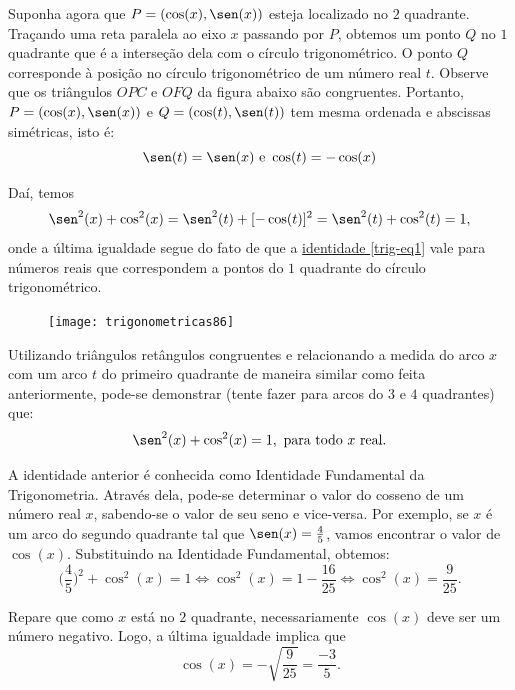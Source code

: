 Suponha agora que $P=(\cos(x), \sen(x))$ esteja localizado no $2$ quadrante. Traçando uma reta paralela ao eixo $x$ passando por $P$, obtemos um ponto $Q$ no $1$ quadrante que é a interseção dela com o círculo trigonométrico. O ponto $Q$ corresponde à posição no círculo trigonométrico de um número real $t$. Observe que os triângulos $OPC$ e $OFQ$ da figura abaixo são congruentes. Portanto, $P = (\cos(x), \sen(x))$ e $Q = (\cos(t), \sen(t))$ tem mesma ordenada e abscissas simétricas, isto é:
\begin{equation*}
\sen(t)=\sen(x)\text{ e }\cos(t)=-\cos(x)
\end{equation*}

Daí, temos 
\begin{equation*}
\sen^2(x) + \cos^2(x) = \sen^2(t) + [-\cos(t)]^2 = \sen^2(t) + \cos^2(t) = 1,
\end{equation*}
onde a última igualdade segue do fato de que a \hyperref[trig-eq1]{identidade \ref{trig-eq1}} vale para números reais que correspondem a pontos do $1$ quadrante do círculo trigonométrico.

\begin{figure}[H]
\centering

\texttt{[image: trigonometricas86]}
\end{figure}

Utilizando triângulos retângulos congruentes e relacionando a medida do arco $x$ com um arco $t$ do primeiro quadrante de maneira similar como feita anteriormente, pode-se demonstrar (tente fazer para arcos do $3$ e $4$ quadrantes) que:
\begin{equation*}
\sen^2(x)+\cos^2(x)=1,\text{ para todo $x$ real}.
\end{equation*}

A identidade anterior é conhecida como Identidade Fundamental da Trigonometria. Através dela, pode-se determinar o valor do cosseno de um número real $x$, sabendo-se o valor de seu seno e vice-versa. Por exemplo, se $x$ é um arco do segundo quadrante tal que $\sen(x)=\frac{4}{5}$, vamos encontrar o valor de $\cos(x)$. Substituindo na Identidade Fundamental, obtemos:
\begin{equation*}
\bigg(\frac{4}{5}\bigg)^2+\cos^2(x)=1\iff\cos^2(x)=1-\frac{16}{25}\iff\cos^2(x)=\frac{9}{25}.
\end{equation*}

Repare que como $x$ está no $2$ quadrante, necessariamente $\cos(x)$ deve ser um número negativo. Logo, a última igualdade implica que 
\begin{equation*}
\cos(x) = -\sqrt{\frac{9}{25}}=\frac{-3}{5}.
\end{equation*} 



















\ifnum{}
\clearpage
\else
\notasfinais
\fi




\nocite{*}


